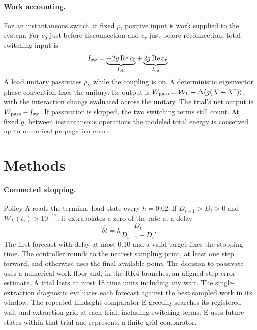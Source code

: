 \documentclass[11pt,a4paper]{article}
\newcommand{\Wp}{\mathcal W_L}
\begin{document}
\paragraph{Work accounting.}
For an instantaneous switch at fixed $\rho$, positive input is work supplied to the system. For $c_0$ just before disconnection and $c_\tau$ just before reconnection, total switching input is
\begin{equation}
 I_{\rm sw}=\underbrace{-2g\operatorname{Re}c_0}_{I_{\rm off}}
            +\underbrace{2g\operatorname{Re}c_\tau}_{I_{\rm on}}.
 \label{eq:switch}
\end{equation}
A load unitary passivates $\rho_L$ while the coupling is on. A deterministic eigenvector phase convention fixes the unitary. Its output is $W_{\rm pass}=\Wp-\Delta\langle g(X+X^\dagger)\rangle$, with the interaction change evaluated across the unitary. The trial's net output is $W_{\rm pass}-I_{\rm sw}$. If passivation is skipped, the two switching terms still count. At fixed $g$, between instantaneous operations the modeled total energy is conserved up to numerical propagation error.

\section{Methods}
\label{sec:methods}

\paragraph{Connected stopping.}
Policy A reads the terminal--load state every $h=0.02$. If $D_{i-1}>D_i>0$ and $\Wp(t_i)>10^{-12}$, it extrapolates a zero of the rate at a delay
\begin{equation}
 \widehat{\delta t}=h\frac{D_i}{D_{i-1}-D_i}.
 \label{eq:forecast}
\end{equation}
The first forecast with delay at most 0.10 and a valid target fixes the stopping time. The controller rounds to the nearest sampling point, at least one step forward, and otherwise uses the final available point. The decision to passivate uses a numerical work floor and, in the RK4 branches, an aligned-step error estimate. A trial lasts at most 18 time units including any wait. The single-extraction diagnostic evaluates each forecast against the best sampled work in its window. The repeated hindsight comparator E greedily searches its registered wait and extraction grid at each trial, including switching terms. E uses future states within that trial and represents a finite-grid comparator.
\end{document}
